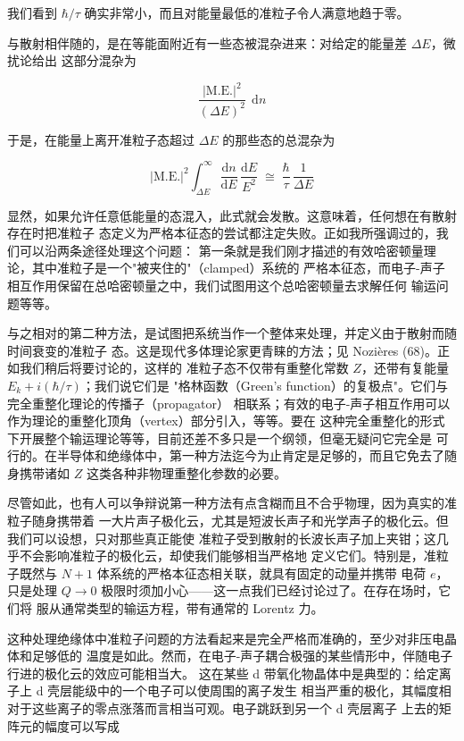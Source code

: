 我们看到 $\hbar/\tau$ 确实非常小，而且对能量最低的准粒子令人满意地趋于零。

与散射相伴随的，是在等能面附近有一些态被混杂进来：对给定的能量差 $\Delta E$，微扰论给出
这部分混杂为

\begin{equation*}
\frac{\bigl|\text{M.E.}\bigr|^{2}}{(\Delta E)^{2}}\;\,\mathrm{d}n
\end{equation*}

于是，在能量上离开准粒子态超过 $\Delta E$ 的那些态的总混杂为

\begin{equation*}
\bigl|\text{M.E.}\bigr|^{2} \int_{\Delta E}^{\infty} \frac{\mathrm{d}n}{\mathrm{d}E}\,\frac{\mathrm{d}E}{E^{2}} \;\cong\; \frac{\hbar}{\tau}\,\frac{1}{\Delta E}
\end{equation*}

显然，如果允许任意低能量的态混入，此式就会发散。这意味着，任何想在有散射存在时把准粒子
态定义为严格本征态的尝试都注定失败。正如我所强调过的，我们可以沿两条途径处理这个问题：
第一条就是我们刚才描述的有效哈密顿量理论，其中准粒子是一个"被夹住的"（clamped）系统的
严格本征态，而电子-声子相互作用保留在总哈密顿量之中，我们试图用这个总哈密顿量去求解任何
输运问题等等。

与之相对的第二种方法，是试图把系统当作一个整体来处理，并定义由于散射而随时间衰变的准粒子
态。这是现代多体理论家更青睐的方法；见 Nozières (68)。正如我们稍后将要讨论的，这样的
准粒子态不仅带有重整化常数 $Z$，还带有复能量 $E_{k} + i(\hbar/\tau)$；我们说它们是
"格林函数（Green's function）的复极点"。它们与完全重整化理论的传播子（propagator）
相联系；有效的电子-声子相互作用可以作为理论的重整化顶角（vertex）部分引入，等等。要在
这种完全重整化的形式下开展整个输运理论等等，目前还差不多只是一个纲领，但毫无疑问它完全是
可行的。在半导体和绝缘体中，第一种方法迄今为止肯定是足够的，而且它免去了随身携带诸如 $Z$
这类各种非物理重整化参数的必要。

尽管如此，也有人可以争辩说第一种方法有点含糊而且不合乎物理，因为真实的准粒子随身携带着
一大片声子极化云，尤其是短波长声子和光学声子的极化云。但我们可以设想，只对那些真正能使
准粒子受到散射的长波长声子加上夹钳；这几乎不会影响准粒子的极化云，却使我们能够相当严格地
定义它们。特别是，准粒子既然与 $N+1$ 体系统的严格本征态相关联，就具有固定的动量并携带
电荷 $e$，只是处理 $Q\to 0$ 极限时须加小心——这一点我们已经讨论过了。在存在场时，它们将
服从通常类型的输运方程，带有通常的 Lorentz 力。

这种处理绝缘体中准粒子问题的方法看起来是完全严格而准确的，至少对非压电晶体和足够低的
温度是如此。然而，在电子-声子耦合极强的某些情形中，伴随电子行进的极化云的效应可能相当大。
这在某些 d 带氧化物晶体中是典型的：给定离子上 d 壳层能级中的一个电子可以使周围的离子发生
相当严重的极化，其幅度相对于这些离子的零点涨落而言相当可观。电子跳跃到另一个 d 壳层离子
上去的矩阵元的幅度可以写成

